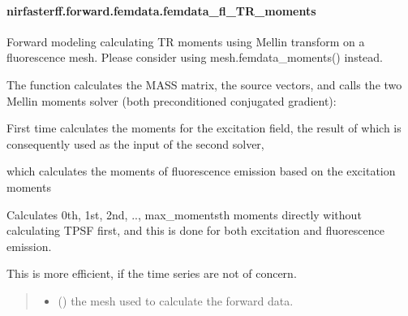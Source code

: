 \documentclass[letterpaper,10pt,english]{sphinxmanual}
\begin{document}
\sphinxstepscope


\paragraph{nirfasterff.forward.femdata.femdata\_fl\_TR\_moments}
\label{\detokenize{_autosummary/nirfasterff.forward.femdata.femdata_fl_TR_moments:nirfasterff-forward-femdata-femdata-fl-tr-moments}}\label{\detokenize{_autosummary/nirfasterff.forward.femdata.femdata_fl_TR_moments::doc}}

\begin{fulllineitems}
\label{\detokenize{_autosummary/nirfasterff.forward.femdata.femdata_fl_TR_moments:nirfasterff.forward.femdata.femdata_fl_TR_moments}}
\pysigstartsignatures
{}
\pysigstopsignatures
\sphinxAtStartPar
Forward modeling calculating TR moments using Mellin transform on a fluorescence mesh. Please consider using mesh.femdata\_moments() instead.

\sphinxAtStartPar
The function calculates the MASS matrix, the source vectors, and calls the two Mellin moments solver (both preconditioned conjugated gradient):

\sphinxAtStartPar
First time calculates the moments for the excitation field, the result of which is consequently used as the input of the second solver,

\sphinxAtStartPar
which calculates the moments of fluorescence emission based on the excitation moments

\sphinxAtStartPar
Calculates 0th, 1st, 2nd, .., max\_moments\sphinxhyphen{}th moments directly without calculating TPSF first, and this is done for both excitation and fluorescence emission.

\sphinxAtStartPar
This is more efficient, if the time series are not of concern.
\begin{quote}\begin{description}
\begin{itemize}
\item {} 
\sphinxAtStartPar
{} () \textendash{} the mesh used to calculate the forward data.


\end{itemize}
\end{description}
\end{quote}
\end{fulllineitems}
\end{document}
